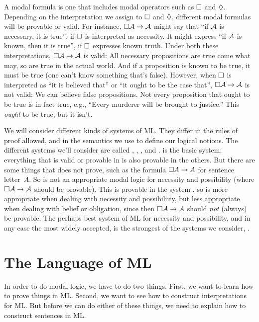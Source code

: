 A modal formula is one that includes modal operators such as $\Box$ and $\Diamond$. Depending on the interpretation we assign to $\Box$ and $\Diamond$, different modal formulas will be provable or valid. For instance, $\Box \mathcal{A} \rightarrow \mathcal{A}$ might say that ``if $\mathcal{A}$ is necessary, it is true'', if $\Box$ is interpreted as necessity. It might express ``if $\mathcal{A}$ is known, then it is true'', if $\Box$ expresses known truth. Under both these interpretations, $\Box\mathcal{A} \rightarrow \mathcal{A}$ is valid: All necessary propositions are true come what may, so are true in the actual world. And if a proposition is known to be true, it must be true (one can't know something that's false). However, when $\Box$ is interpreted as ``it is believed that'' or ``it ought to be the case that'', $\Box\mathcal{A} \rightarrow \mathcal{A}$ is not valid: We can believe false propositions. Not every proposition that ought to be true is in fact true, e.g., ``Every murderer will be brought to justice.'' This \emph{ought} to be true, but it isn't.

We will consider different kinds of systems of ML. They differ in the rules of proof allowed, and in the semantics we use to define our logical notions. The different systems we'll consider are called \mlK, \mlT, \mlSfour, and \mlSfive. \mlK{} is the basic system; everything that is valid or provable in \mlK{} is also provable in the others. But there are some things that \mlK{} does not prove, such as the formula $\Box A \rightarrow A$ for sentence letter~$A$. So \mlK{} is not an appropriate modal logic for necessity and possibility (where $\Box\mathcal{A} \rightarrow \mathcal{A}$ should be provable). This is provable in the system \mlT, so \mlT{} is more appropriate when dealing with necessity and possibiliity, but less appropriate when dealing with belief or obligation, since then $\Box\mathcal{A} \rightarrow \mathcal{A}$ should \emph{not} (always) be provable. The perhaps best system of ML for necessity and possibility, and in any case the most widely accepted, is the strongest of the systems we consider, \mlSfive.

\section{The Language of ML}
\label{TFLtoML}

In order to do modal logic, we have to do two things. First, we want to learn how to prove things in ML. Second, we want to see how to construct interpretations for ML. But before we can do either of these things, we need to explain how to construct sentences in ML.

